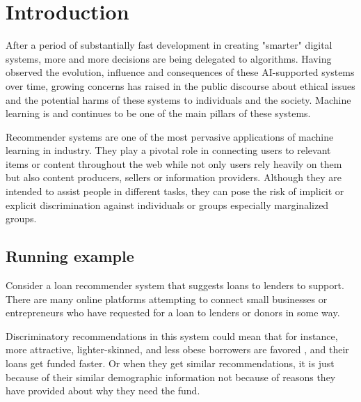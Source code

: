\chapter{Introduction}
\label{introchap}




After a period of substantially fast development in creating "smarter" digital systems, more and more decisions are being delegated to algorithms. Having observed the evolution, influence and consequences of these AI-supported systems over time, growing concerns has raised in the public discourse about ethical issues and the potential harms of these systems to individuals and the society. Machine learning is and continues to be one of the main pillars of these systems. 
 
Recommender systems are one of the most pervasive applications of machine learning in industry. They play a pivotal role in  connecting users to relevant items or content throughout the web while not only users rely heavily on them but also content producers, sellers or information providers. %
Although they are intended to assist people in different tasks, they can pose the risk of implicit or explicit discrimination against individuals or groups especially marginalized groups.

\section{Running example}
Consider a loan recommender system that suggests loans to lenders to support. There are many online platforms attempting to connect small businesses or entrepreneurs who have requested for a loan to lenders or donors in some way. 

Discriminatory recommendations in this system could mean that for instance, more attractive, lighter-skinned, and less obese borrowers are favored \cite{JENQ2015234}, and their loans get funded faster. Or when they get similar recommendations, it is just because of their similar demographic information not because of reasons they have provided about why they need the fund.

